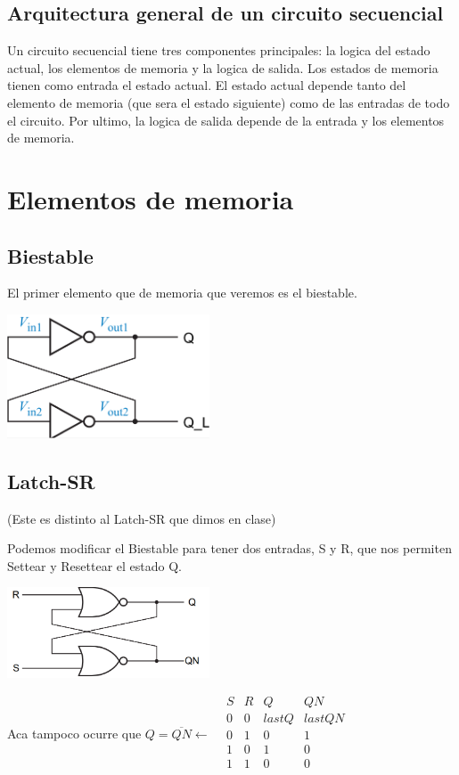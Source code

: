 \documentclass{report}
\begin{document}
\section{Arquitectura general de un circuito secuencial}

Un circuito secuencial tiene tres componentes principales: la logica del estado actual, los elementos de memoria y la logica de salida. Los estados de memoria tienen como entrada el estado actual. El estado actual depende tanto del elemento de memoria (que sera el estado siguiente) como de las entradas de todo el circuito. Por ultimo, la logica de salida depende de la entrada y los elementos de memoria.


\chapter{Elementos de memoria}

\section{Biestable}
El primer elemento que de memoria que veremos es el biestable.

\includegraphics[width=6cm]{../Assets/bistable.png}

\section{Latch-SR}

 (Este es distinto al Latch-SR que dimos en clase) \

Podemos modificar el Biestable para tener dos entradas, S y R, que nos permiten Settear y Resettear el estado Q.

\includegraphics[width=6cm]{../Assets/latch-sr.png}

Aca tampoco ocurre que $Q=\overline{QN} \leftarrow$ \
$\begin{array}{cc|cc}
		S & R & Q     & QN     \\ \hline
		0 & 0 & lastQ & lastQN \\
		0 & 1 & 0     & 1      \\
		1 & 0 & 1     & 0      \\
		1 & 1 & 0     & 0      \\
	\end{array}$
\end{document}
